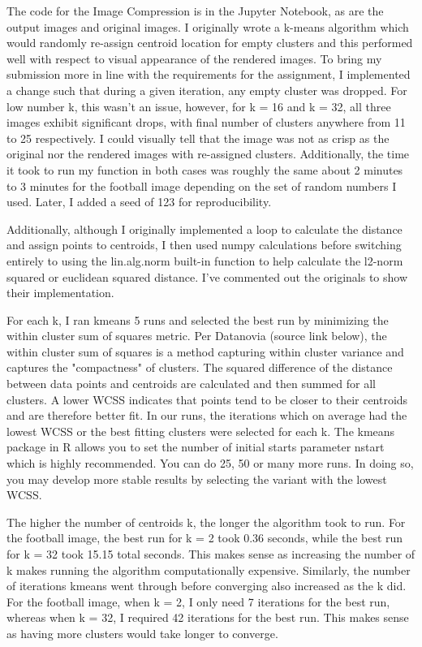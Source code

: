 \documentclass{article}
\begin{document}
The code for the Image Compression is in the Jupyter Notebook, as are the output images and original images.
I originally wrote a k-means algorithm which would randomly re-assign centroid location for empty clusters and this
performed well with respect to visual appearance of the rendered images. To bring my submission more in line
with the requirements for the assignment, I implemented a change such that during a given iteration, any empty
cluster was dropped. For low number k, this wasn't an issue, however, for k = 16 and k = 32, all three images
exhibit significant drops, with final number of clusters anywhere from 11 to 25 respectively. I could visually
tell that the image was not as crisp as the original nor the rendered images with re-assigned clusters. Additionally,
the time it took to run my function in both cases was roughly the same about 2 minutes to 3 minutes for the
football image depending on the set of random numbers I used. Later, I added a seed of 123 for reproducibility.

Additionally, although I originally implemented a loop to calculate the distance and assign points to centroids,
I then used numpy calculations before switching entirely to using the lin.alg.norm built-in function to help
calculate the l2-norm squared or euclidean squared distance. I've commented out the originals to show their implementation.

For each k, I ran kmeans 5 runs and selected the best run by minimizing the within cluster sum of squares metric.
Per Datanovia (source link below), the within cluster sum of squares is a method capturing within cluster variance
and captures the "compactness" of clusters. The squared difference of the distance between
data points and centroids are calculated and then summed for all clusters. A lower WCSS indicates that points
tend to be closer to their centroids and are therefore better fit. In our runs, the iterations which on average
had the lowest WCSS or the best fitting clusters were selected for each k. The kmeans package in R allows you
to set the number of initial starts parameter nstart which is highly recommended. You can do 25, 50 or many more
runs. In doing so, you may develop more stable results by selecting the variant with the lowest WCSS.

The higher the number of centroids k, the longer the algorithm took to run. For the football image, the best
run for k = 2 took 0.36 seconds, while the best run for k = 32 took 15.15 total seconds. This makes
sense as increasing the number of k makes running the algorithm computationally expensive. Similarly, the number
of iterations kmeans went through before converging also increased as the k did. For the football image,
when k = 2, I only need 7 iterations for the best run, whereas when k = 32, I required 42 iterations for the best
run. This makes sense as having more clusters would take longer to converge.
\end{document}
